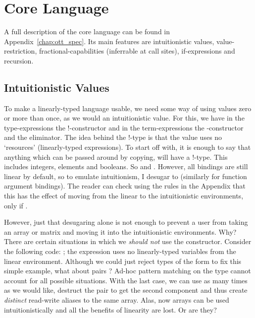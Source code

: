 \section{Core Language}

A full description of the core language can be found in
Appendix~\ref{chap:ott_spec}. Its main features are intuitionistic values,
value-restriction, fractional-capabilities (inferrable at call sites),
if-expressions and recursion.

\subsection{Intuitionistic Values}


To make a linearly-typed language usable, we need some way of using values zero
or more than once, as we would an intuitionistic value. For this, we have in
the type-expressions the !-constructor and in the term-expressions the
-constructor and the  eliminator.
The idea behind the !-type is that the value uses no `resources'
(linearly-typed expressions). To start off with, it is enough to say that
anything which can be passed around by copying, will have a !-type. This
includes integers, elements and booleans. So  and . However, all bindings are still linear by default, so to emulate
intuitionism, I desugar  to   (similarly for function
argument bindings). The reader can check using the rules in the Appendix that
this has the effect of moving  from the linear to the
intuitionistic environments, only if .

However, just that desugaring alone is not enough to prevent a user from taking
an array or matrix and moving it into the intuitionistic environments. Why?
There are certain situations in which we \emph{should not} use the 
constructor.  Consider the following code: ; the expression  uses no linearly-typed variables
from the linear environment. Although we could just reject types of the form
 to fix this simple example, what about pairs ?  Ad-hoc pattern matching on the type cannot
account for all possible situations. With the last case, we can use 
as many times as we would like, destruct the pair to get the second component
and thus create \emph{distinct} read-write aliases to the same array.  Alas,
now arrays can be used intuitionistically and all the benefits of linearity are
lost.  Or are they?

